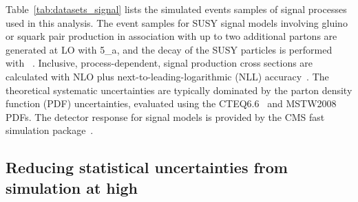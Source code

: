 Table~\ref{tab:datasets_signal} lists the simulated events samples of
signal processes used in this analysis. The event samples for SUSY
signal models involving gluino or squark pair production in
association with up to two additional partons are generated at LO with
{\MADGRAPH{}5\_a\MCATNLO}, and the decay of the SUSY particles is
performed with ~\cite{pythia}. Inclusive,
process-dependent, signal production cross sections are calculated
with NLO plus next-to-leading-logarithmic (NLL)
accuracy~\cite{Beenakker:1996ch, PhysRevLett.102.111802,
  PhysRevD.80.095004, 1126-6708-2009-12-041,
  doi:10.1142/S0217751X11053560, susynlo}. The theoretical systematic
uncertainties are typically dominated by the parton density function
(PDF) uncertainties, evaluated using the
CTEQ6.6~\cite{Nadolsky:2008zw} and MSTW2008~\cite{Martin:2009iq} PDFs.
The detector response for signal models is provided by the CMS fast
simulation package~\cite{fastsim}.

\clearpage
\begin{table}[h!]
  \footnotesize 
  
  \label{tab:datasets_data}
\end{table}

\begin{table}[h!]
  \centering
  \fontsize{7}{8.4}\selectfont
  
  \label{tab:datasets_bkg}
\end{table}

\begin{table}[h!]
  \centering
  \fontsize{7}{8.4}\selectfont
  
  \label{tab:datasets_bkg2}
\end{table}

\begin{table}[h!]
  \centering
  \footnotesize
  
  \label{tab:datasets_signal}
\end{table}

\subsection{Reducing statistical uncertainties from simulation at high \texorpdfstring{\nb}{Nb}}

